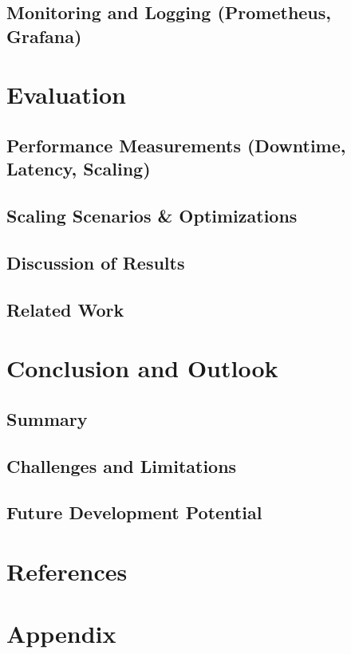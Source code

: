 \documentclass[11pt, a4paper, oneside]{scrartcl}
\begin{document}
        \subsection{Monitoring and Logging (Prometheus, Grafana)}

    \section{Evaluation}

        \subsection{Performance Measurements (Downtime, Latency, Scaling)}

        \subsection{Scaling Scenarios & Optimizations}

        \subsection{Discussion of Results}

        \subsection{Related Work}

    \section{Conclusion and Outlook}

        \subsection{Summary}

        \subsection{Challenges and Limitations}

        \subsection{Future Development Potential}

    \section*{References}

    \section*{Appendix}
\end{document}
